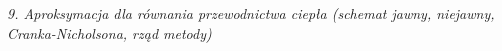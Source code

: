 \textit{9. Aproksymacja dla równania przewodnictwa ciepła (schemat jawny, niejawny, Cranka-Nicholsona, rząd metody)}